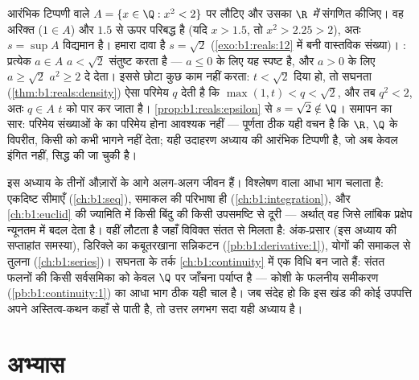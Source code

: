 \begin{example}[वह उच्चतम जो $\Q$ से भाग निकला]\label{ex:b1:reals:supescape}
आरंभिक टिप्पणी वाले  $A = \{x \in \Q : x^2 < 2\}$ पर लौटिए और उसका
 \emph{$\R$ में} संगणित कीजिए। वह अरिक्त ($1 \in A$) और $1.5$ से ऊपर
परिबद्ध है (यदि $x > 1.5$, तो $x^2 > 2.25 > 2$), अतः $s = \sup A$ विद्यमान
है। हमारा दावा है $s = \sqrt 2$ (\cref{exo:b1:reals:12} में बनी वास्तविक
संख्या)। : प्रत्येक $a \in A$ $a < \sqrt2$ संतुष्ट करता है --- $a
\leq 0$ के लिए यह स्पष्ट है, और $a > 0$ के लिए $a \geq \sqrt2$ $a^2 \geq 2$
दे देता। इससे छोटा कुछ काम नहीं करता: $t < \sqrt2$ दिया हो, तो सघनता
(\cref{thm:b1:reals:density}) ऐसा परिमेय $q$ देती है कि $\max(1, t) < q <
\sqrt 2$, और तब $q^2 < 2$, अतः $q \in A$ $t$ को पार कर जाता है।
\cref{prop:b1:reals:epsilon} से $s = \sqrt2 \notin \Q$। समापन का सार: परिमेय
संख्याओं के  का  परिमेय होना आवश्यक नहीं --- पूर्णता ठीक यही
वचन है कि $\R$, $\Q$ के विपरीत, किसी  को कभी भागने नहीं देता; यही
उदाहरण अध्याय की आरंभिक टिप्पणी है, जो अब केवल इंगित नहीं, सिद्ध की जा चुकी
है।
\end{example}

\begin{remark}[इस खंड के भीतर आगे की दृष्टि]
इस अध्याय के तीनों औज़ारों के आगे अलग-अलग जीवन हैं।  विश्लेषण वाला आधा
भाग चलाता है: एकदिष्ट सीमाएँ (\cref{ch:b1:seq}), समाकल की परिभाषा ही
(\cref{ch:b1:integration}), और \cref{ch:b1:euclid} की ज्यामिति में किसी
बिंदु की किसी उपसमष्टि से दूरी --- अर्थात् वह  जिसे लांबिक प्रक्षेप
न्यूनतम में बदल देता है।  वहीं लौटता है जहाँ विविक्त संतत से मिलता
है: अंक-प्रसार (इस अध्याय की सप्ताहांत समस्या), डिरिक्ले का कबूतरखाना
सन्निकटन (\cref{pb:b1:derivative:1}), योगों की समाकल से तुलना
(\cref{ch:b1:series})। सघनता के तर्क \cref{ch:b1:continuity} में एक विधि बन
जाते हैं: संतत फलनों की किसी सर्वसमिका को केवल $\Q$ पर जाँचना पर्याप्त है
--- कोशी के फलनीय समीकरण (\cref{pb:b1:continuity:1}) का आधा भाग ठीक यही चाल
है। जब संदेह हो कि इस खंड की कोई उपपत्ति अपने अस्तित्व-कथन कहाँ से पाती है,
तो उत्तर लगभग सदा यही अध्याय है।
\end{remark}

\section{अभ्यास}

